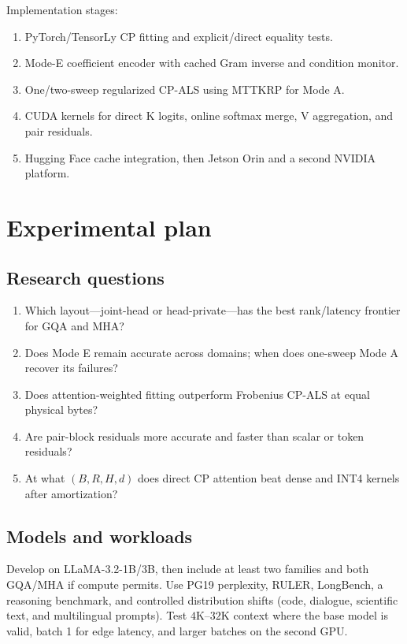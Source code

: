 \documentclass[11pt]{article}
\begin{document}
Implementation stages:
\begin{enumerate}[leftmargin=1.55em,itemsep=2pt]
\item PyTorch/TensorLy CP fitting and explicit/direct equality tests.
\item Mode-E coefficient encoder with cached Gram inverse and condition monitor.
\item One/two-sweep regularized CP-ALS using MTTKRP for Mode A.
\item CUDA kernels for direct K logits, online softmax merge, V aggregation, and pair residuals.
\item Hugging Face cache integration, then Jetson Orin and a second NVIDIA platform.
\end{enumerate}

\section{Experimental plan}
\label{sec:experiments}

\subsection{Research questions}
\begin{enumerate}[leftmargin=1.55em,itemsep=2pt]
\item Which layout---joint-head or head-private---has the best rank/latency frontier for GQA and MHA?
\item Does Mode E remain accurate across domains; when does one-sweep Mode A recover its failures?
\item Does attention-weighted fitting outperform Frobenius CP-ALS at equal physical bytes?
\item Are pair-block residuals more accurate and faster than scalar or token residuals?
\item At what $(B,R,H,d)$ does direct CP attention beat dense and INT4 kernels after amortization?
\end{enumerate}

\subsection{Models and workloads}
Develop on LLaMA-3.2-1B/3B, then include at least two families and both GQA/MHA if compute permits.
Use PG19 perplexity, RULER, LongBench, a reasoning benchmark, and controlled distribution shifts
(code, dialogue, scientific text, and multilingual prompts). Test $4$K--$32$K context where the
base model is valid, batch 1 for edge latency, and larger batches on the second GPU.
\end{document}
